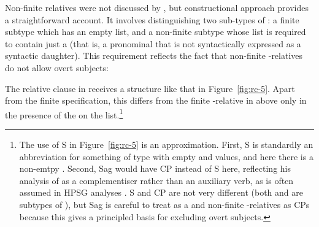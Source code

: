 \documentclass[output=paper
 	        ,biblatex
                ,babelshorthands
                ,newtxmath
                ,draftmode
                ,colorlinks, citecolor=brown
]{langscibook}
\begin{document}
Non-finite relatives were not discussed by \cite{Pollard:Sag:94}, but 
constructional approach provides a straightforward account. It involves
distinguishing two sub-types of : a finite subtype which has an empty
 list, and a non-finite subtype whose  list is required to contain
just a  (that is, a pronominal that is not syntactically expressed as a
syntactic daughter). This requirement reflects the fact that non-finite
-relatives do not allow overt subjects:
\begin{exe}
\end{exe}
The relative clause in  receives a structure like that in
Figure~\ref{fig:rc-5}. Apart from the finite specification, this differs from the finite
-relative in  above only in the presence of the  on the
 list.\footnote{The use of S in Figure~\ref{fig:rc-5} is an
  approximation. First, S is standardly an abbreviation for something of type
   with empty  and \comps values,
  and here there is a non-emtpy . Second, Sag would have CP instead of S here,
  reflecting his analysis of  as a complementiser rather than an auxiliary verb,
  as is often assumed in HPSG analyses \citep[e.g.][51--52]{Ginzburg:Sag:00}. S and CP are
  not very different (both  and  are
  subtypes of ), but Sag is careful to treat  as a
   and non-finite -relatives as CPs because this gives a
  principled basis for excluding overt subjects.}
\end{document}

